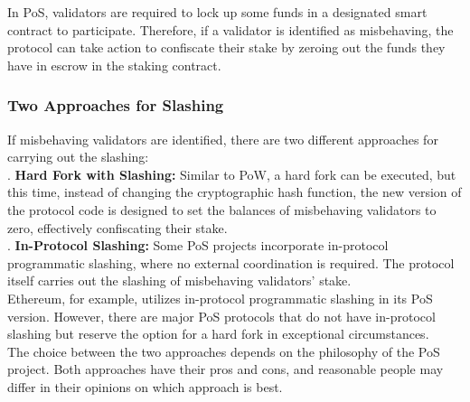 In PoS, validators are required to lock up some funds in a designated smart contract to participate. Therefore, if a validator is identified as misbehaving, the protocol can take action to confiscate their stake by zeroing out the funds they have in escrow in the staking contract.

\subsubsection{Two Approaches for Slashing}
If misbehaving validators are identified, there are two different approaches for carrying out the slashing:\\
. \textbf{Hard Fork with Slashing:} Similar to PoW, a hard fork can be executed, but this time, instead of changing the cryptographic hash function, the new version of the protocol code is designed to set the balances of misbehaving validators to zero, effectively confiscating their stake.\\
. \textbf{In-Protocol Slashing:} Some PoS projects incorporate in-protocol programmatic slashing, where no external coordination is required. The protocol itself carries out the slashing of misbehaving validators' stake.\\

Ethereum, for example, utilizes in-protocol programmatic slashing in its PoS version. However, there are major PoS protocols that do not have in-protocol slashing but reserve the option for a hard fork in exceptional circumstances.\\
The choice between the two approaches depends on the philosophy of the PoS project. Both approaches have their pros and cons, and reasonable people may differ in their opinions on which approach is best.\\

